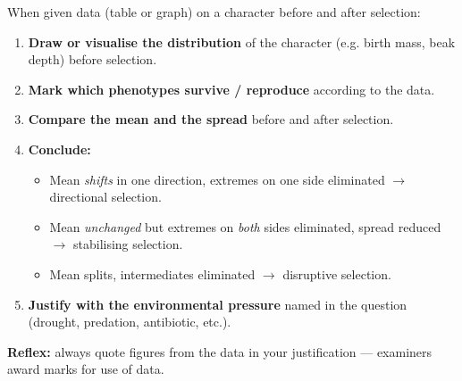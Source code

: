 \documentclass[11pt]{article}
\newcommand{\cle}[1]{{\popxbold\color{popdark}#1}}
\begin{document}
\begin{methode}
When given data (table or graph) on a character before and after selection:
\begin{enumerate}
\item \textbf{Draw or visualise the distribution} of the character (e.g. birth mass, beak depth) before selection.
\item \textbf{Mark which phenotypes survive / reproduce} according to the data.
\item \textbf{Compare the mean and the spread} before and after selection.
\item \textbf{Conclude:}
\begin{itemize}
\item Mean \emph{shifts} in one direction, extremes on one side eliminated $\rightarrow$ \cle{directional selection}.
\item Mean \emph{unchanged} but extremes on \emph{both} sides eliminated, spread reduced $\rightarrow$ \cle{stabilising selection}.
\item Mean splits, intermediates eliminated $\rightarrow$ \cle{disruptive selection}.
\end{itemize}
\item \textbf{Justify with the environmental pressure} named in the question (drought, predation, antibiotic, etc.).
\end{enumerate}
\textbf{Reflex:} always quote figures from the data in your justification — examiners award marks for use of data.
\end{methode}
\end{document}
